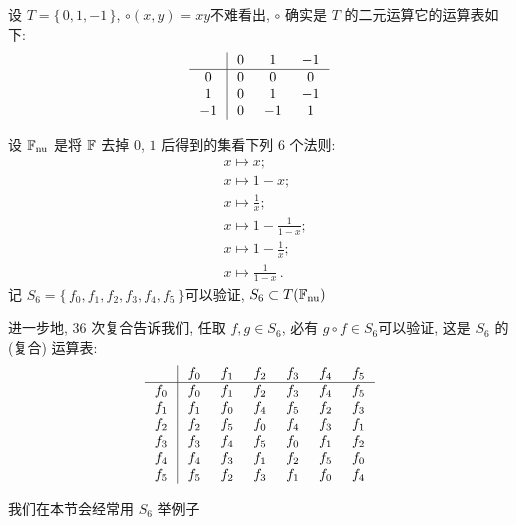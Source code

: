 \begin{example}
    设 $T = \{\, 0,1,-1 \,\}$, $\circ (x,y) = xy$\period 不难看出, $\circ$ 确实是 $T$ 的二元运算\period 它的运算表如下:
    \begin{align*}
        \arraycolsep=0.25cm
        \begin{array}{c|ccc}
            \  & 0 & 1  & -1 \\ \hline
            0  & 0 & 0  & 0  \\
            1  & 0 & 1  & -1 \\
            -1 & 0 & -1 & 1  \\
        \end{array}
    \end{align*}
\end{example}

\begin{example}
    设 $\mathbb{F}_{\mathrm{nu}}$ 是将 $\mathbb{F}$ 去掉 $0$, $1$ 后得到的集\period 看下列 $6$ 个法则:
    \begin{align*}
         & x \mapsto x; \tag*{$f_0 \colon$}                   \\
         & x \mapsto 1-x; \tag*{$f_1 \colon$}                 \\
         & x \mapsto \frac{1}{x}; \tag*{$f_2 \colon$}         \\
         & x \mapsto 1-\frac{1}{1-x}; \tag*{$f_3 \colon$}     \\
         & x \mapsto 1-\frac{1}{x}; \tag*{$f_4 \colon$}       \\
         & x \mapsto \frac{1}{1-x}\period \tag*{$f_5 \colon$}
    \end{align*}
    记 $S_6 = \{\, f_0,f_1,f_2,f_3,f_4,f_5 \,\}$\period 可以验证, $S_6 \subset T(\mathbb{F}_{\mathrm{nu}})$\period

    进一步地, $36$ 次复合告诉我们, 任取 $f,g \in S_6$, 必有 $g \circ f \in S_6$\period 可以验证, 这是 $S_6$ 的 (复合) 运算表:
    \begin{align*}
        \arraycolsep=0.25cm
        \begin{array}{c|cccccc}
            \     & f_{0} & f_{1} & f_{2} & f_{3} & f_{4} & f_{5} \\ \hline
            f_{0} & f_{0} & f_{1} & f_{2} & f_{3} & f_{4} & f_{5} \\
            f_{1} & f_{1} & f_{0} & f_{4} & f_{5} & f_{2} & f_{3} \\
            f_{2} & f_{2} & f_{5} & f_{0} & f_{4} & f_{3} & f_{1} \\
            f_{3} & f_{3} & f_{4} & f_{5} & f_{0} & f_{1} & f_{2} \\
            f_{4} & f_{4} & f_{3} & f_{1} & f_{2} & f_{5} & f_{0} \\
            f_{5} & f_{5} & f_{2} & f_{3} & f_{1} & f_{0} & f_{4} \\
        \end{array}
    \end{align*}

    我们在本节会经常用 $S_6$ 举例子\period
\end{example}

